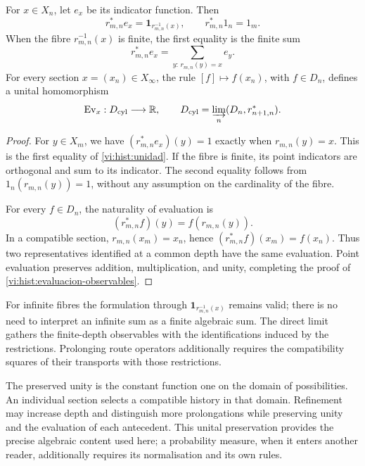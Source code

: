\begin{lemma}
For \(x\in X_n\), let \(e_x\) be its indicator function. Then
\begin{equation}
 r_{m,n}^*e_x=\mathbf1_{r_{m,n}^{-1}(x)},\qquad
 r_{m,n}^*1_n=1_m.
 \label{vi:hist:unidad}
\end{equation}
When the fibre \(r_{m,n}^{-1}(x)\) is finite, the first equality is
the finite sum
\[
 r_{m,n}^*e_x=\sum_{y:\,r_{m,n}(y)=x}e_y.
\]
For every section \(x=(x_n)\in X_\infty\), the rule
\([f]\mapsto f(x_n)\), with \(f\in D_n\), defines a unital
homomorphism
\begin{equation}
 \operatorname{Ev}_x:D_{\mathrm{cyl}}\longrightarrow\mathbb R,
 \qquad
 D_{\mathrm{cyl}}=\varinjlim_n(D_n,r_{n+1,n}^*).
 \label{vi:hist:evaluacion-observables}
\end{equation}
\end{lemma}
\begin{proof}
For \(y\in X_m\), we have
\((r_{m,n}^*e_x)(y)=1\) exactly when \(r_{m,n}(y)=x\).
This is the first equality of \eqref{vi:hist:unidad}. If the fibre is
finite, its point indicators are orthogonal and sum to its indicator.
The second equality follows from \(1_n(r_{m,n}(y))=1\), without any
assumption on the cardinality of the fibre.

For every \(f\in D_n\), the naturality of evaluation is
\[
 (r_{m,n}^*f)(y)=f(r_{m,n}(y)).
\]
In a compatible section, \(r_{m,n}(x_m)=x_n\), hence
\((r_{m,n}^*f)(x_m)=f(x_n)\). Thus two representatives identified
at a common depth have the same evaluation.
Point evaluation preserves addition, multiplication, and unity, completing
the proof of \eqref{vi:hist:evaluacion-observables}.
\end{proof}

For infinite fibres the formulation through
\(\mathbf1_{r_{m,n}^{-1}(x)}\) remains valid; there is no need to interpret an
infinite sum as a finite algebraic sum. The direct limit gathers the
finite-depth observables with the identifications induced by
the restrictions. Prolonging route operators additionally requires
the compatibility squares of their transports with those restrictions.

The preserved unity is the constant function one on the domain of
possibilities. An individual section selects a compatible history
in that domain. Refinement may increase depth and distinguish
more prolongations while preserving unity and the evaluation of each
antecedent. This unital preservation provides the precise algebraic content
used here; a probability measure, when it enters
another reader, additionally requires its normalisation and its own rules.
